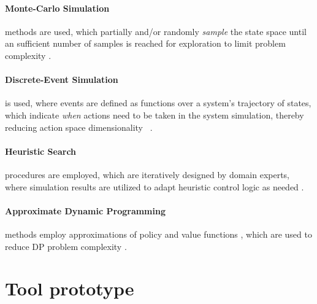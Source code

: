 \documentclass[a4paper,twoside]{article}
\begin{document}
\paragraph{Monte-Carlo Simulation} methods are used, which partially and/or randomly \textit{sample} the state space until an sufficient number of samples is reached for exploration to limit problem complexity \cite{ascher_hackenberg_2015}. 
\paragraph{Discrete-Event Simulation} is used, where events are defined as functions over a system's trajectory of states, which indicate \textit{when} actions need to be taken in the system simulation, thereby reducing action space dimensionality ~\cite{ascher2023discrete}.
\paragraph{Heuristic Search} procedures are employed, which are iteratively designed by domain experts, where simulation results are utilized to adapt heuristic control logic as needed \cite{ascher_hackenberg_2015}.
\paragraph{Approximate Dynamic Programming} methods employ approximations of policy and value functions \cite{powell_approximate_2007}, which are used to reduce DP problem complexity \cite{ascher_hackenberg_albayrak_2023}.

	
	\section{Tool prototype}
	\label{sec:tool-prototype}
	
\end{document}
